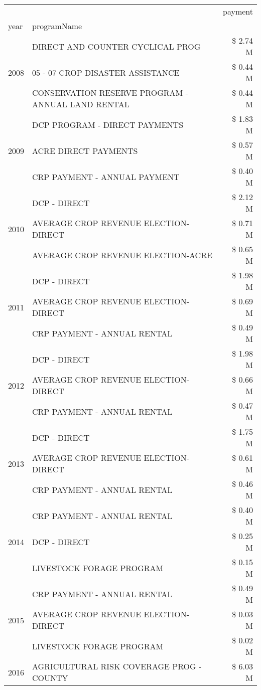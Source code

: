 \begin{tabular}{llr}
\toprule
 &  & payment \\
year & programName &  \\
\midrule
\multirow[t]{3}{*}{2008} & DIRECT AND COUNTER CYCLICAL PROG & \$ 2.74 M \\
 & 05 - 07 CROP DISASTER ASSISTANCE & \$ 0.44 M \\
 & CONSERVATION RESERVE PROGRAM - ANNUAL LAND RENTAL & \$ 0.44 M \\
\cline{1-3}
\multirow[t]{3}{*}{2009} & DCP PROGRAM - DIRECT PAYMENTS & \$ 1.83 M \\
 & ACRE DIRECT PAYMENTS & \$ 0.57 M \\
 & CRP PAYMENT - ANNUAL PAYMENT & \$ 0.40 M \\
\cline{1-3}
\multirow[t]{3}{*}{2010} & DCP - DIRECT & \$ 2.12 M \\
 & AVERAGE CROP REVENUE ELECTION-DIRECT & \$ 0.71 M \\
 & AVERAGE CROP REVENUE ELECTION-ACRE & \$ 0.65 M \\
\cline{1-3}
\multirow[t]{3}{*}{2011} & DCP - DIRECT & \$ 1.98 M \\
 & AVERAGE CROP REVENUE ELECTION-DIRECT & \$ 0.69 M \\
 & CRP PAYMENT - ANNUAL RENTAL & \$ 0.49 M \\
\cline{1-3}
\multirow[t]{3}{*}{2012} & DCP - DIRECT & \$ 1.98 M \\
 & AVERAGE CROP REVENUE ELECTION-DIRECT & \$ 0.66 M \\
 & CRP PAYMENT - ANNUAL RENTAL & \$ 0.47 M \\
\cline{1-3}
\multirow[t]{3}{*}{2013} & DCP - DIRECT & \$ 1.75 M \\
 & AVERAGE CROP REVENUE ELECTION-DIRECT & \$ 0.61 M \\
 & CRP PAYMENT - ANNUAL RENTAL & \$ 0.46 M \\
\cline{1-3}
\multirow[t]{3}{*}{2014} & CRP PAYMENT - ANNUAL RENTAL & \$ 0.40 M \\
 & DCP - DIRECT & \$ 0.25 M \\
 & LIVESTOCK FORAGE PROGRAM & \$ 0.15 M \\
\cline{1-3}
\multirow[t]{3}{*}{2015} & CRP PAYMENT - ANNUAL RENTAL & \$ 0.49 M \\
 & AVERAGE CROP REVENUE ELECTION-DIRECT & \$ 0.03 M \\
 & LIVESTOCK FORAGE PROGRAM & \$ 0.02 M \\
\cline{1-3}
\multirow[t]{3}{*}{2016} & AGRICULTURAL RISK COVERAGE PROG - COUNTY & \$ 6.03 M \\

\end{tabular}
